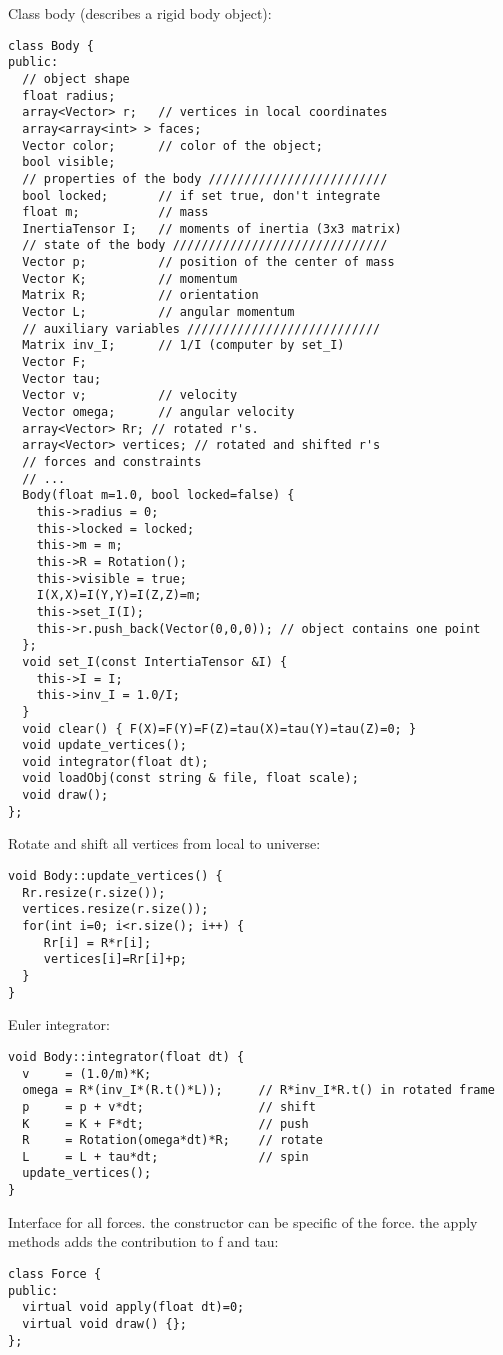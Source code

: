 Class body (describes a rigid body object): \begin{lstlisting}
class Body {
public:
  // object shape
  float radius;
  array<Vector> r;   // vertices in local coordinates
  array<array<int> > faces;
  Vector color;      // color of the object; 
  bool visible;
  // properties of the body /////////////////////////
  bool locked;       // if set true, don't integrate
  float m;           // mass
  InertiaTensor I;   // moments of inertia (3x3 matrix)
  // state of the body //////////////////////////////
  Vector p;          // position of the center of mass
  Vector K;          // momentum
  Matrix R;          // orientation
  Vector L;          // angular momentum
  // auxiliary variables ///////////////////////////
  Matrix inv_I;      // 1/I (computer by set_I)
  Vector F;
  Vector tau;
  Vector v;          // velocity
  Vector omega;      // angular velocity
  array<Vector> Rr; // rotated r's.
  array<Vector> vertices; // rotated and shifted r's
  // forces and constraints
  // ...
  Body(float m=1.0, bool locked=false) {
    this->radius = 0;
    this->locked = locked;
    this->m = m;
    this->R = Rotation();
    this->visible = true;
    I(X,X)=I(Y,Y)=I(Z,Z)=m;
    this->set_I(I);
    this->r.push_back(Vector(0,0,0)); // object contains one point
  };
  void set_I(const IntertiaTensor &I) {
    this->I = I;
    this->inv_I = 1.0/I;
  }
  void clear() { F(X)=F(Y)=F(Z)=tau(X)=tau(Y)=tau(Z)=0; }
  void update_vertices();
  void integrator(float dt);
  void loadObj(const string & file, float scale);
  void draw();
};
\end{lstlisting}
\noindent
Rotate and shift all vertices from local to universe: \begin{lstlisting}
void Body::update_vertices() {
  Rr.resize(r.size());
  vertices.resize(r.size());
  for(int i=0; i<r.size(); i++) {
     Rr[i] = R*r[i];
     vertices[i]=Rr[i]+p;
  }
}
\end{lstlisting}
\noindent
Euler integrator: \begin{lstlisting}
void Body::integrator(float dt) {  
  v     = (1.0/m)*K;
  omega = R*(inv_I*(R.t()*L));     // R*inv_I*R.t() in rotated frame
  p     = p + v*dt;                // shift
  K     = K + F*dt;                // push
  R     = Rotation(omega*dt)*R;    // rotate
  L     = L + tau*dt;              // spin
  update_vertices();
}
\end{lstlisting}
\noindent
Interface for all forces.
the constructor can be specific of the force.
the apply methods adds the contribution to f and tau: \begin{lstlisting}
class Force {
public:
  virtual void apply(float dt)=0;
  virtual void draw() {};
};
\end{lstlisting}
